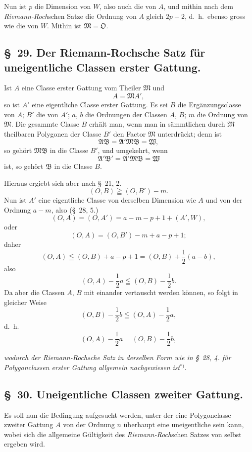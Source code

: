 \documentclass{article}
\begin{document}
Nun ist $p$ die Dimension von $W$, also auch die von $A$, und mithin nach dem \emph{Riemann-Roch}schen Satze die Ordnung von $A$ gleich $2p-2$, d.\ h.\ ebenso gross wie die von $W$. Mithin ist $\mathfrak{M} = \mathfrak{O}$.

\subsection*{§~29. Der Riemann-Rochsche Satz für uneigentliche Classen erster Gattung.}

Ist $A$ eine Classe erster Gattung vom Theiler $\mathfrak{M}$ und
\[ A = \mathfrak{M}A', \]
so ist $A'$ eine eigentliche Classe erster Gattung. Es sei $B$ die Ergänzungsclasse von $A$; $B'$ die von $A'$; $a$, $b$ die Ordnungen der Classen $A$, $B$; $m$ die Ordnung von $\mathfrak{M}$. Die gesammte Classe $B$ erhält man, wenn man in sämmtlichen durch $\mathfrak{M}$ theilbaren Polygonen der Classe $B'$ den Factor $\mathfrak{M}$ unterdrückt; denn ist
\[ \mathfrak{A}\mathfrak{B} = \mathfrak{A}'\mathfrak{M}\mathfrak{B} = \mathfrak{W}, \]
so gehört $\mathfrak{M}\mathfrak{B}$ in die Classe $B'$, und umgekehrt, wenn
\[ \mathfrak{A}'\mathfrak{B}' = \mathfrak{A}'\mathfrak{M}\mathfrak{B} = \mathfrak{W} \]
ist, so gehört $\mathfrak{B}$ in die Classe $B$.

Hieraus ergiebt sich aber nach §~21, 2.
\[ (O, B) \geqq (O, B')-m. \]
Nun ist $A'$ eine eigentliche Classe von derselben Dimension wie $A$ und von der Ordnung $a-m$, also (§~28, 5.)
\[ (O, A) = (O, A') = a-m-p+1+(A', W), \]
oder
\[ (O, A) = (O, B')-m+a-p+1; \]
daher
\[ (O, A) \leqq (O, B)+a-p+1 = (O, B)+\frac{1}{2}(a-b), \]
also
\[ (O, A)-\frac{1}{2}a \leqq (O, B)-\frac{1}{2}b. \]
Da aber die Classen $A$, $B$ mit einander vertauscht werden können, so folgt in gleicher Weise
\[ (O, B)-\frac{1}{2}b \leqq (O, A)-\frac{1}{2}a, \]
d.\ h.
\[ (O, A)-\frac{1}{2}a = (O, B)-\frac{1}{2}b, \]

\emph{wodurch der Riemann-Rochsche Satz in derselben Form wie in §~28, 4. für Polygonclassen erster Gattung allgemein nachgewiesen ist}${}^{*)}$.

\subsection*{§~30. Uneigentliche Classen zweiter Gattung.}

Es soll nun die Bedingung aufgesucht werden, unter der eine Polygonclasse zweiter Gattung $A$ von der Ordnung $n$ überhaupt eine uneigentliche sein kann, wobei sich die allgemeine Gültigkeit des \emph{Riemann-Roch}schen Satzes von selbst ergeben wird.
\end{document}

